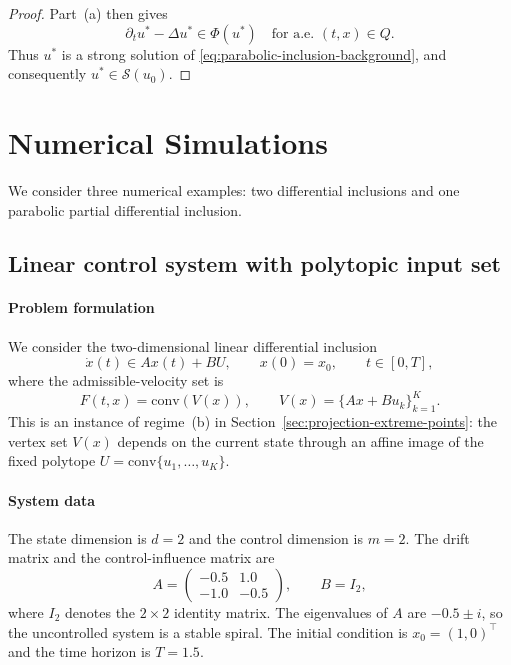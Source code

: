\documentclass[11pt]{elsarticle}
\theoremstyle{definition}
\theoremstyle{remark}
\numberwithin{equation}{section}
\begin{document}
\begin{proof}
		Part~\textup{(a)} then gives
		\[
		\partial_tu^\ast-\Delta u^\ast
		\in\Phi(u^\ast)
		\quad\text{for a.e. }(t,x)\in Q.
		\]
		Thus $u^\ast$ is a strong solution of
		\eqref{eq:parabolic-inclusion-background}, and consequently $u^\ast\in\mathcal{S}(u_0)$.	
	\end{proof}


\section{Numerical Simulations}
\label{sec:numerics}
We consider three numerical examples: two differential inclusions and one
parabolic partial differential inclusion. 
\subsection{Linear control system with polytopic input set}
\label{subsec:linear-control}

\paragraph{Problem formulation}
We consider the two-dimensional linear differential inclusion
\begin{equation}
  \label{eq:linear-control}
  \dot{x}(t) \in Ax(t) + BU,
  \qquad x(0) = x_0,
  \qquad t \in [0, T],
\end{equation}
where the admissible-velocity set is
\begin{equation}
  \label{eq:Fx-linear}
  F(t,x) = \mathrm{conv}(V(x)),
  \qquad
  V(x) = \{Ax + Bu_k\}_{k=1}^{K}.
\end{equation}
This is an instance of regime~(b) in Section~\ref{sec:projection-extreme-points}:
the vertex set $V(x)$ depends on the current state through an affine image of
the fixed polytope $U = \mathrm{conv}\{u_1,\dots,u_K\}$.

\paragraph{System data}
The state dimension is $d = 2$ and the control dimension is $m = 2$.
The drift matrix and the control-influence matrix are
\begin{equation}
  \label{eq:AB-matrices}
  A =
  \begin{pmatrix}
    -0.5 &  1.0 \\
    -1.0 & -0.5
  \end{pmatrix},
  \qquad
  B = I_2,
\end{equation}
where $I_2$ denotes the $2\times 2$ identity matrix.
The eigenvalues of $A$ are $-0.5 \pm i$, so the uncontrolled system is a
stable spiral.
The initial condition is $x_0 = (1, 0)^\top$ and the time horizon is $T = 1.5$.
\end{document}
